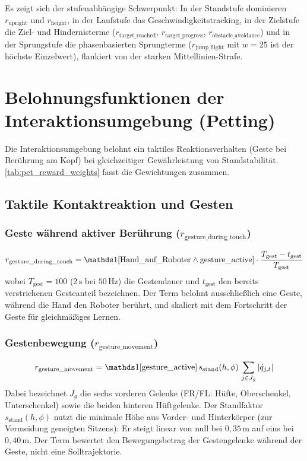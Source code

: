 Es zeigt sich der stufenabhängige Schwerpunkt: In der Standstufe dominieren $r_{\text{upright}}$ und $r_{\text{height}}$, in der Laufstufe das Geschwindigkeitstracking, in der Zielstufe die Ziel- und Hindernisterme ($r_{\text{target\_reached}}$, $r_{\text{target\_progress}}$, $r_{\text{obstacle\_avoidance}}$) und in der Sprungstufe die phasenbasierten Sprungterme ($r_{\text{jump\_flight}}$ mit $w=25$ ist der höchste Einzelwert), flankiert von der starken Mittellinien-Strafe.

\section{Belohnungsfunktionen der Interaktionsumgebung (Petting)}

Die Interaktionsumgebung belohnt ein taktiles Reaktionsverhalten (Geste bei Berührung am Kopf) bei gleichzeitiger Gewährleistung von Standstabilität. \autoref{tab:pet_reward_weights} fasst die Gewichtungen zusammen.

\subsection{Taktile Kontaktreaktion und Gesten}

\subsubsection{Geste während aktiver Berührung ($r_{\text{gesture\_during\_touch}}$)}
\begin{equation}\label{eq:pet_gesture_during_touch_math}
r_{\text{gesture\_during\_touch}} = \ind[\text{Hand\_auf\_Roboter} \wedge \text{gesture\_active}] \cdot \frac{T_{\text{gest}} - t_{\text{gest}}}{T_{\text{gest}}}
\end{equation}
wobei $T_{\text{gest}}=100$ ($2\,\text{s}$ bei $50\,\text{Hz}$) die Gestendauer und $t_{\text{gest}}$ den bereits verstrichenen Gesteanteil bezeichnen. Der Term belohnt ausschließlich eine Geste, während die Hand den Roboter berührt, und skaliert mit dem Fortschritt der Geste für gleichmäßiges Lernen.

\subsubsection{Gestenbewegung ($r_{\text{gesture\_movement}}$)}
\begin{equation}\label{eq:pet_gesture_movement_math}
r_{\text{gesture\_movement}} = \ind[\text{gesture\_active}]\, s_{\text{stand}}(h,\phi)\, \sum_{j\in J_g}|\dot q_{j,t}|
\end{equation}
Dabei bezeichnet $J_g$ die sechs vorderen Gelenke (FR/FL: Hüfte, Oberschenkel, Unterschenkel) sowie die beiden hinteren Hüftgelenke. Der Standfaktor $s_{\text{stand}}(h,\phi)$ nutzt die minimale Höhe aus Vorder- und Hinterkörper (zur Vermeidung geneigten Sitzens): Er steigt linear von null bei $0{,}35\,\text{m}$ auf eins bei $0{,}40\,\text{m}$. Der Term bewertet den Bewegungsbetrag der Gestengelenke während der Geste, nicht eine Solltrajektorie.


